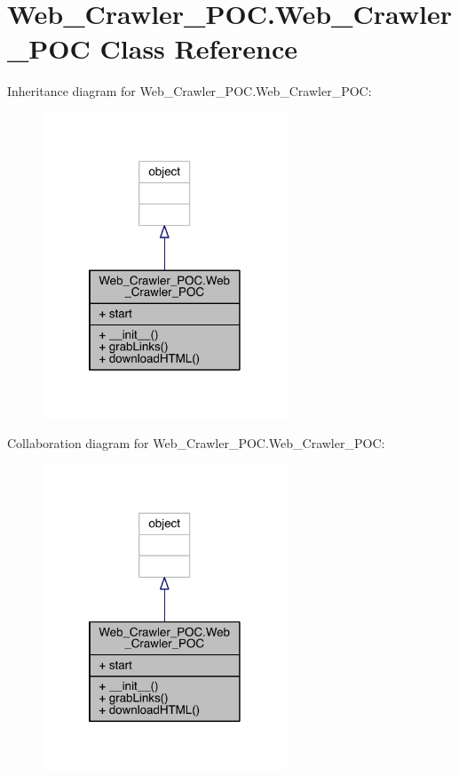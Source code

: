 \hypertarget{class_web___crawler___p_o_c_1_1_web___crawler___p_o_c}{}\section{Web\+\_\+\+Crawler\+\_\+\+P\+O\+C.\+Web\+\_\+\+Crawler\+\_\+\+P\+OC Class Reference}
\label{class_web___crawler___p_o_c_1_1_web___crawler___p_o_c}


Inheritance diagram for Web\+\_\+\+Crawler\+\_\+\+P\+O\+C.\+Web\+\_\+\+Crawler\+\_\+\+P\+OC\+:
\nopagebreak
\begin{figure}[H]
\begin{center}
\leavevmode
\includegraphics[width=206pt]{class_web___crawler___p_o_c_1_1_web___crawler___p_o_c__inherit__graph}
\end{center}
\end{figure}


Collaboration diagram for Web\+\_\+\+Crawler\+\_\+\+P\+O\+C.\+Web\+\_\+\+Crawler\+\_\+\+P\+OC\+:
\nopagebreak
\begin{figure}[H]
\begin{center}
\leavevmode
\includegraphics[width=206pt]{class_web___crawler___p_o_c_1_1_web___crawler___p_o_c__coll__graph}
\end{center}
\end{figure}
